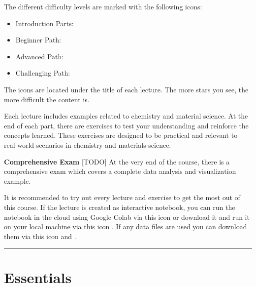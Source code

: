 \documentclass[
  letterpaper,
  DIV=11,
  numbers=noendperiod]{scrreprt}
\providecommand{\tightlist}{%
  \setlength{\itemsep}{0pt}\setlength{\parskip}{0pt}}\usepackage{longtable,booktabs,array}
\begin{document}
The different difficulty levels are marked with the following icons:

\begin{itemize}
\tightlist
\item
  Introduction Parts: ~~~ { }
\item
  Beginner Path:~~~ ~~~ ~~~~{}
\item
  Advanced Path: ~~~~ { }
\item
  Challenging Path:~~~ ~~ { }
\end{itemize}

The icons are located under the title of each lecture. The more stars
you see, the more difficult the content is.

Each lecture includes examples related to chemistry and material
science. At the end of each part, there are exercises to test your
understanding and reinforce the concepts learned. These exercises are
designed to be practical and relevant to real-world scenarios in
chemistry and materials science.

\textbf{Comprehensive Exam} {[}TODO{]} At the very end of the course,
there is a comprehensive exam which covers a complete data analysis and
visualization example.

\begin{tcolorbox}[enhanced jigsaw, leftrule=.75mm, bottomrule=.15mm, colbacktitle=quarto-callout-important-color!10!white, title=\textcolor{quarto-callout-important-color}{\faExclamation}\hspace{0.5em}{Important}, breakable, arc=.35mm, toptitle=1mm, opacityback=0, titlerule=0mm, coltitle=black, colback=white, opacitybacktitle=0.6, colframe=quarto-callout-important-color-frame, left=2mm, rightrule=.15mm, toprule=.15mm, bottomtitle=1mm]

It is recommended to try out every lecture and exercise to get the most
out of this course. If the lecture is created as interactive notebook,
you can run the notebook in the cloud using Google Colab via this icon
or download it and run it on your local machine via this icon . If any
data files are used you can download them via this icon and .

\end{tcolorbox}

\begin{center}\rule{0.5\linewidth}{0.5pt}\end{center}

\part{Essentials}
\end{document}
